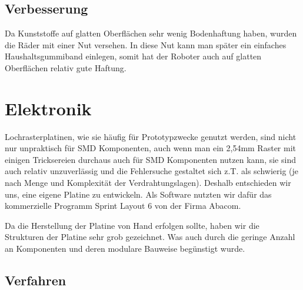 \documentclass[12pt]{article}
\begin{document}
\subsection{Verbesserung}
Da Kunststoffe auf glatten Oberflächen sehr wenig Bodenhaftung haben, wurden die Räder mit einer Nut versehen. In diese Nut kann man später ein einfaches Haushaltsgummiband einlegen, somit hat der Roboter auch auf glatten Oberflächen relativ gute Haftung.

\newpage    
\section{Elektronik}%

Lochrasterplatinen, wie sie häufig für Prototypzwecke genutzt werden, sind nicht nur unpraktisch für SMD Komponenten, auch wenn man ein 2,54mm Raster mit einigen Tricksereien durchaus auch für SMD Komponenten nutzen kann, sie sind auch relativ unzuverlässig und die Fehlersuche gestaltet sich z.T. als schwierig (je nach Menge und Komplexität der Verdrahtungslagen).
Deshalb entschieden wir uns, eine eigene Platine zu entwickeln.
Als Software nutzten wir dafür das kommerzielle Programm Sprint Layout 6 von der Firma Abacom.

Da die Herstellung der Platine von Hand erfolgen sollte, haben wir die Strukturen der Platine sehr grob gezeichnet. Was auch durch die geringe Anzahl an Komponenten und deren modulare Bauweise begünstigt wurde.

\subsection{Verfahren}%
\end{document}
